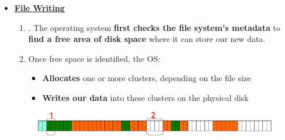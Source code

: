 \begin{itemize}
    \item \textcolor{Red2}{\underline{\textbf{File Writing}}}
    \begin{enumerate}
        \item {}. The operating system \textbf{first checks the file system's metadata} to \textbf{find a free area of disk space} where it can store our new data.
        \item Once free space is identified, the OS:
        \begin{itemize}
            \item \textbf{Allocates} one or more clusters, depending on the file size
            \item \textbf{Writes our data} into these clusters on the physical disk
        \end{itemize}
    \end{enumerate}
    \begin{figure}[!htp]
        \centering
        \includegraphics[width=.8\textwidth]{img/files-3.pdf}
    \end{figure}


\end{itemize}
